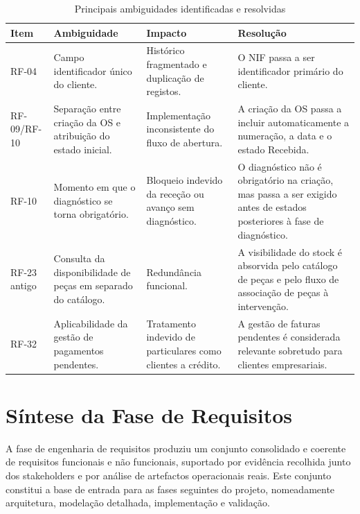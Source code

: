 \documentclass[a4paper,12pt]{scrreprt}
\begin{document}
        \begin{table}[H]
            \centering
            \small
            \begin{tabular}{|p{1.8cm}|p{4.6cm}|p{3.4cm}|p{5cm}|}
                \hline
                \rowcolor{gray!20!white}
                \textbf{Item} & \textbf{Ambiguidade} & \textbf{Impacto} & \textbf{Resolução} \\
                \hline
                RF-04 & Campo identificador único do cliente. & Histórico fragmentado e duplicação de registos. & O NIF passa a ser identificador primário do cliente. \\
                \hline
                RF-09/RF-10 & Separação entre criação da OS e atribuição do estado inicial. & Implementação inconsistente do fluxo de abertura. & A criação da OS passa a incluir automaticamente a numeração, a data e o estado Recebida. \\
                \hline
                RF-10 & Momento em que o diagnóstico se torna obrigatório. & Bloqueio indevido da receção ou avanço sem diagnóstico. & O diagnóstico não é obrigatório na criação, mas passa a ser exigido antes de estados posteriores à fase de diagnóstico. \\
                \hline
                RF-23 antigo & Consulta da disponibilidade de peças em separado do catálogo. & Redundância funcional. & A visibilidade do stock é absorvida pelo catálogo de peças e pelo fluxo de associação de peças à intervenção. \\
                \hline
                RF-32 & Aplicabilidade da gestão de pagamentos pendentes. & Tratamento indevido de particulares como clientes a crédito. & A gestão de faturas pendentes é considerada relevante sobretudo para clientes empresariais. \\
                \hline
            \end{tabular}
            \caption{Principais ambiguidades identificadas e resolvidas}
        \end{table}

    \section{Síntese da Fase de Requisitos}
        A fase de engenharia de requisitos produziu um conjunto consolidado e coerente de requisitos funcionais e não funcionais, suportado por evidência recolhida junto dos stakeholders e por análise de artefactos operacionais reais. Este conjunto constitui a base de entrada para as fases seguintes do projeto, nomeadamente arquitetura, modelação detalhada, implementação e validação.
\end{document}
